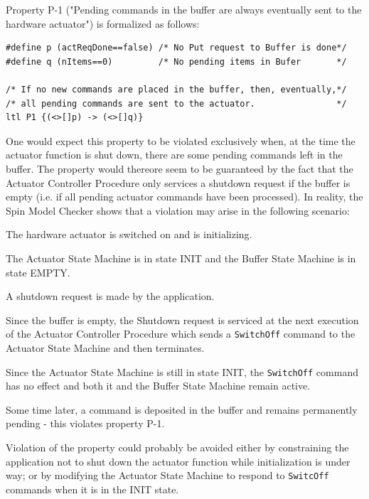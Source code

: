 \documentclass[definition]{../fwprofile}
\begin{document}
Property P-1 ("Pending commands in the buffer are always eventually sent to the hardware actuator") is formalized as follows:

\captionsetup[lstlisting]{labelformat=empty,labelsep=none}

\begin{lstlisting}
#define p (actReqDone==false) /* No Put request to Buffer is done*/
#define q (nItems==0)         /* No pending items in Bufer       */

/* If no new commands are placed in the buffer, then, eventually,*/
/* all pending commands are sent to the actuator.                */
ltl P1 {(<>[]p) -> (<>[]q)}
\end{lstlisting}

One would expect this property to be violated exclusively when, at the time the actuator function is shut down, there are some pending commands left in the buffer. The property would thereore seem to be guaranteed by the fact that the Actuator Controller Procedure only services a shutdown request if the buffer is empty (i.e. if all pending  actuator commands have been processed). In reality, the Spin Model Checker shows that a violation may arise in the following scenario:

\begin{fw_itemize}
\item The hardware actuator is switched on and is initializing.
\item The Actuator State Machine is in state INIT and the Buffer State Machine is in state EMPTY.
\item A shutdown request is made by the application. 
\item Since the buffer is empty, the Shutdown request is serviced at the next execution of the Actuator Controller Procedure which sends a \texttt{SwitchOff} command to the Actuator State Machine and then terminates.
\item Since the Actuator State Machine is still in state INIT, the \texttt{SwitchOff} command has no effect and both it and the Buffer State Machine remain active.
\item Some time later, a command is deposited in the buffer and remains permanently pending - this violates property P-1.
\end{fw_itemize}

Violation of the property could probably be avoided either by constraining the application not to shut down the actuator function while initialization is under way; or by modifying the Actuator State Machine to respond to \texttt{SwitcOff} commands when it is in the INIT state.
\end{document}

